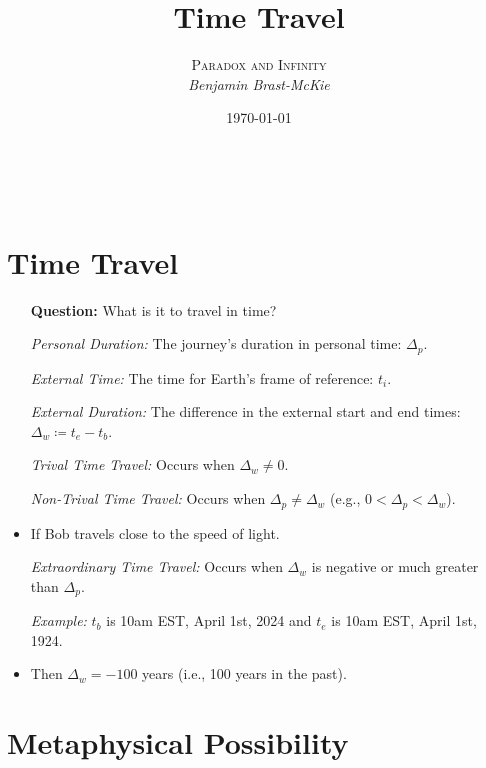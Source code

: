\documentclass[a4paper, 11pt]{article} %
\title{\textbf{Time Travel}} %
\author{\textsc{Paradox and Infinity}\\ \em Benjamin Brast-McKie} %
\date{\today} %
\makeatletter
\renewcommand{\maketitle}{ %
\begin{flushright} %
{\LARGE\@title} %

\vspace{10pt} %

{\@author} %
\\\@date %

\vspace{-20pt} %
\end{flushright}
}
\makeatother
\begin{document}
\maketitle %

\thispagestyle{empty}



\section*{Time Travel}

\begin{itemize}
  \item[\bf Question:] What is it to travel in time?
  \item[\it Personal Duration:] The journey's duration in personal time: $\Delta_p$.
  \item[\it External Time:] The time for Earth's frame of reference: $t_i$.
  \item[\it External Duration:] The difference in the external start and end times: $\Delta_w \coloneq t_e - t_b$.
  \item[\it Trival Time Travel:] Occurs when $\Delta_w \neq 0$.
  \item[\it Non-Trival Time Travel:] Occurs when $\Delta_p \neq \Delta_w$ (e.g., $0 < \Delta_p < \Delta_w$).
    \item If Bob travels close to the speed of light.
  \item[\it Extraordinary Time Travel:] Occurs when $\Delta_w$ is negative or much greater than $\Delta_p$.
  \item[\it Example:] $t_b$ is 10am EST, April 1st, 2024 and $t_e$ is 10am EST, April 1st, 1924.
    \item Then $\Delta_w = -100$ years (i.e., 100 years in the past). 
\end{itemize}



\section*{Metaphysical Possibility}
\end{document}
